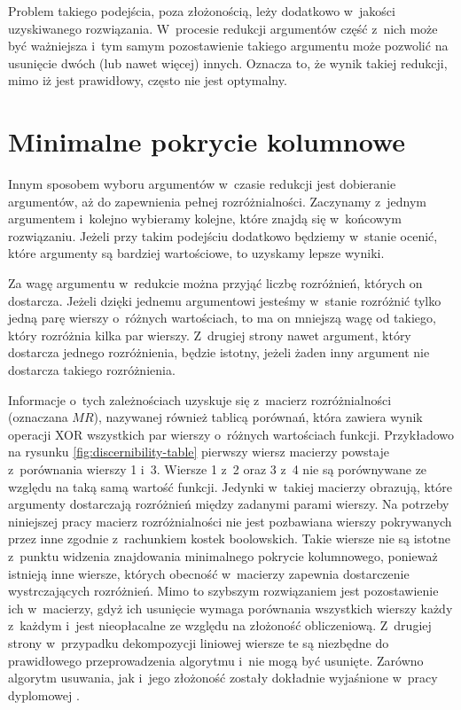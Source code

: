 Problem takiego podejścia,
poza złożonością,
leży dodatkowo w~jakości uzyskiwanego rozwiązania.
W~procesie redukcji argumentów część z~nich może być ważniejsza
i~tym samym pozostawienie takiego argumentu może pozwolić na usunięcie dwóch (lub nawet więcej) innych.
Oznacza to,
że wynik takiej redukcji,
mimo iż jest prawidłowy,
często nie jest optymalny.

\section{Minimalne pokrycie kolumnowe}

Innym sposobem wyboru argumentów w~czasie redukcji jest dobieranie argumentów,
aż do zapewnienia pełnej rozróżnialności.
Zaczynamy z~jednym argumentem i~kolejno wybieramy kolejne,
które znajdą się w~końcowym rozwiązaniu.
Jeżeli przy takim podejściu dodatkowo będziemy w~stanie ocenić,
które argumenty są bardziej wartościowe,
to uzyskamy lepsze wyniki.

Za wagę argumentu w~redukcie można przyjąć liczbę rozróżnień,
których on dostarcza.
Jeżeli dzięki jednemu argumentowi jesteśmy w~stanie rozróżnić tylko jedną parę wierszy o~różnych wartościach,
to ma on mniejszą wagę od takiego,
który rozróżnia kilka par wierszy.
Z~drugiej strony nawet argument,
który dostarcza jednego rozróżnienia,
będzie istotny,
jeżeli żaden inny argument nie dostarcza takiego rozróżnienia.

Informacje o~tych zależnościach uzyskuje się z~macierz rozróżnialności (oznaczana $MR$), nazywanej również tablicą porównań,
która zawiera wynik operacji XOR wszystkich par wierszy o~różnych wartościach funkcji.
Przykładowo na rysunku \ref{fig:discernibility-table} pierwszy wiersz macierzy powstaje z~porównania wierszy 1 i~3.
Wiersze 1 z~2 oraz 3 z~4 nie są porównywane ze względu na taką samą wartość funkcji.
Jedynki w~takiej macierzy obrazują,
które argumenty dostarczają rozróżnień między zadanymi parami wierszy.
Na potrzeby niniejszej pracy macierz rozróżnialności nie jest pozbawiana wierszy pokrywanych przez inne zgodnie z~rachunkiem kostek boolowskich.
Takie wiersze nie są istotne z~punktu widzenia znajdowania minimalnego pokrycie kolumnowego,
ponieważ istnieją inne wiersze, których obecność w~macierzy zapewnia dostarczenie wystrczających rozróżnień.
Mimo to szybszym rozwiązaniem jest pozostawienie ich w~macierzy,
gdyż ich usunięcie wymaga porównania wszystkich wierszy każdy z~każdym
i~jest nieopłacalne ze względu na złożoność obliczeniową.
Z~drugiej strony w~przypadku dekompozycji liniowej wiersze te są niezbędne do prawidłowego przeprowadzenia algorytmu i~nie mogą być usunięte.
Zarówno algorytm usuwania,
jak i~jego złożoność zostały dokładnie wyjaśnione w~pracy dyplomowej \cite{inzynierka}.

